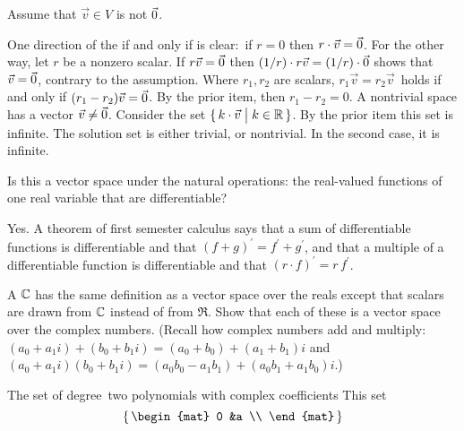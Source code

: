 \begin{exercises}
\begin{answer}
      Assume that \( \vec{v}\in V \) is not \( \vec{0} \).
      \begin{exparts}
        \partsitem One direction of the if and only if is clear:~if $r=0$
          then $r\cdot\vec{v}=\vec{0}$.
          For the other way, let \( r \) be a nonzero scalar.
          If \( r\vec{v}=\vec{0} \) then
          \( (1/r)\cdot r\vec{v}=(1/r)\cdot \vec{0} \) shows that
          $\vec{v}=\vec{0}$,  contrary to the assumption.
        \partsitem Where \( r_1,r_2 \) are scalars, 
          \( r_1\vec{v}=r_2\vec{v}\, \)
          holds if and only if \( (r_1-r_2)\vec{v}=\vec{0} \).
          By the prior item, then \( r_1-r_2=0 \).
        \partsitem A nontrivial space has a vector 
          \( \vec{v}\neq\vec{0} \).
          Consider the set \( \mbox{$\{\,k\cdot\vec{v}\bigm| k\in\mathbb{R}\,\}$} \).
          By the prior item this set is infinite.
        \partsitem The solution set is either trivial, or nontrivial.
          In the second case, it is infinite.   
     \end{exparts}  
    \end{answer}
  \item 
    Is this a vector space under the natural operations: the real-valued
    functions of one real variable that are differentiable?
    \begin{answer}
      Yes.
      A theorem of first semester calculus says that a sum of differentiable
      functions is differentiable and that
      \( (f+g)^\prime=f^\prime+g^\prime \), and that 
      a multiple of a differentiable
      function is differentiable and that \( (r\cdot f)^\prime=r\,f^\prime \). 
    \end{answer}
  \item 
    A %
    $\mathbb{C}$ has the same definition
    as a vector space over the reals except that scalars are drawn from
    \( \mathbb{C} \) instead of from \( \Re \).
    Show that each of these is a vector space over the complex numbers.
    (Recall how complex numbers add and multiply:
    \( (a_0+a_1i)+(b_0+b_1i)=(a_0+b_0)+(a_1+b_1)i \) and
    \( (a_0+a_1i)(b_0+b_1i)=(a_0b_0-a_1b_1)+(a_0b_1+a_1b_0)i \).)
    \begin{exparts}
      \partsitem The set of degree~two polynomials with complex 
         coefficients
      \partsitem This set
        \begin{equation*}
          \set{\begin{mat}
                 0  &a  \\

\end{mat}}
\end{equation*}
\end{exparts}
\end{exercises}
